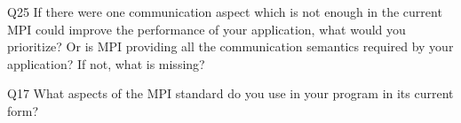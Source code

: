 \begin{description}%
\item{Q25} If there were one communication aspect which is not enough in the current MPI could improve the performance of your application, what would you prioritize? Or is MPI providing all the communication semantics required by your application? If not, what is missing?%
\item{Q17} What aspects of the MPI standard do you use in your program in its current form?%
\end{description}%
